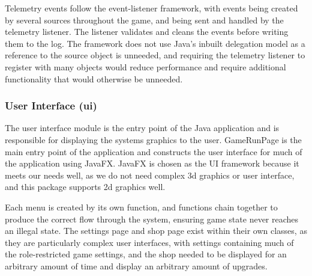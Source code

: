 Telemetry events follow the event-listener framework, with events being created by several sources throughout the game, and being sent and handled by the telemetry listener. The listener validates and cleans the events before writing them to the log. The framework does not use Java's inbuilt delegation model as a reference to the source object is unneeded, and requiring the telemetry listener to register with many objects would reduce performance and require additional functionality that would otherwise be unneeded.

\subsubsection{User Interface (ui)}
The user interface module is the entry point of the Java application and is responsible for displaying the systems graphics to the user. GameRunPage is the main entry point of the application and constructs the user interface for much of the application using JavaFX. JavaFX is chosen as the UI framework because it meets our needs well, as we do not need complex 3d graphics or user interface, and this package supports 2d graphics well.

Each menu is created by its own function, and functions chain together to produce the correct flow through the system, ensuring game state never reaches an illegal state. The settings page and shop page exist within their own classes, as they are particularly complex user interfaces, with settings containing much of the role-restricted game settings, and the shop needed to be displayed for an arbitrary amount of time and display an arbitrary amount of upgrades.
